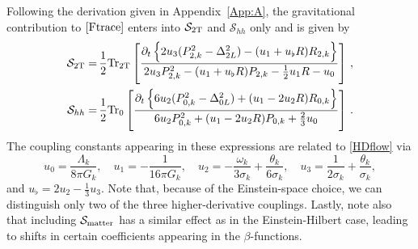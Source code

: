 \documentclass[preprint,preprintnumbers,amsmath,amssymb,nofootinbib,APS]{revtex4}
\newcommand{\be}{\begin{equation}}
\newcommand{\ee}{\end{equation}}
\let\s=\sigma \let\t=\tau   \let\vph=\varphi \let\ph=\phi \let\c=\chi
\newcommand{\Tr}{{\rm Tr}}
\newcommand{\cS}{\mathcal{S}}
\newcommand{\2}{\sqrt{2\,}}
\newcommand{\p}{\partial}
\begin{document}
Following the derivation given in Appendix~\ref{App:A}, 
the gravitational contribution to $\eqref{Ftrace}$
enters into $\cS_{\rm 2T}$ and $\cS_{hh}$ only and is given by
\be\label{Tr:grav}
\begin{split}
\cS_{\rm 2T} = & \,  \frac{1}{2} \Tr_{\rm 2T} 
\left[
\frac{\p_t \left\{ 2 u_3 (P_{2,k}^2 - \D_{2L}^2)  - (u_1 + u_\flat R) R_{2,k} \right\}}
{2 u_3 P_{2,k}^2 - (u_1 + u_\flat R ) P_{2,k} - \tfrac{1}{2} u_1 R - u_0} 
\right] \, , \\
%
\cS_{hh} = & \, \frac{1}{2} \Tr_{\rm 0} \left[
\frac{\p_t \left\{ 6 u_2 (P_{0,k}^2 - \D_{0L}^2) + (u_1 - 2  u_2 R) R_{0,k}  \right\}}{6 u_2 P_{0,k}^2 + (u_1 - 2 u_2 R) P_{0,k} + \tfrac{2}{3} u_0}
\right] \, . \\
\end{split}
\ee
%
 The coupling constants appearing in these expressions are related to \eqref{HDflow} via 
 \be\label{couplings}
 u_0 = \frac{\Lambda_k}{8 \pi G_k},\quad
 u_1 = -\frac{1}{16 \pi G_k},\quad
 u_2 = - \frac{\omega_k}{3 \sigma_k}+ \frac{\theta_k}{6\s_k},\quad
 u_3 = \frac{1}{2 \sigma_k}+\frac{\theta_k}{\s_k},
 \ee
 and $u_\flat = 2u_2-\tfrac{1}{3}u_3$. Note that, because of the Einstein-space choice, we can distinguish only two of the three higher-derivative couplings.
Lastly, note also that including $\cS_{\rm matter}$ has a similar effect as in the Einstein-Hilbert case, leading to shifts in certain coefficients appearing in the $\beta$-functions.
\end{document}
